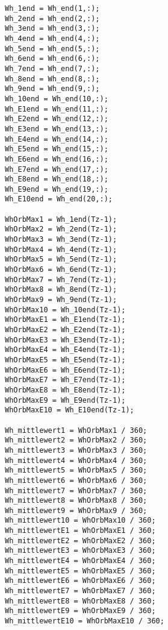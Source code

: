 \begin{appendix}
\begin{lstlisting}
Wh_1end = Wh_end(1,:);
Wh_2end = Wh_end(2,:);
Wh_3end = Wh_end(3,:);
Wh_4end = Wh_end(4,:);
Wh_5end = Wh_end(5,:);
Wh_6end = Wh_end(6,:);
Wh_7end = Wh_end(7,:);
Wh_8end = Wh_end(8,:);
Wh_9end = Wh_end(9,:);
Wh_10end = Wh_end(10,:);
Wh_E1end = Wh_end(11,:);
Wh_E2end = Wh_end(12,:);
Wh_E3end = Wh_end(13,:);
Wh_E4end = Wh_end(14,:);
Wh_E5end = Wh_end(15,:);
Wh_E6end = Wh_end(16,:);
Wh_E7end = Wh_end(17,:);
Wh_E8end = Wh_end(18,:);
Wh_E9end = Wh_end(19,:);
Wh_E10end = Wh_end(20,:);

WhOrbMax1 = Wh_1end(Tz-1);
WhOrbMax2 = Wh_2end(Tz-1);
WhOrbMax3 = Wh_3end(Tz-1);
WhOrbMax4 = Wh_4end(Tz-1);
WhOrbMax5 = Wh_5end(Tz-1);
WhOrbMax6 = Wh_6end(Tz-1);
WhOrbMax7 = Wh_7end(Tz-1);
WhOrbMax8 = Wh_8end(Tz-1);
WhOrbMax9 = Wh_9end(Tz-1);
WhOrbMax10 = Wh_10end(Tz-1);
WhOrbMaxE1 = Wh_E1end(Tz-1);
WhOrbMaxE2 = Wh_E2end(Tz-1);
WhOrbMaxE3 = Wh_E3end(Tz-1);
WhOrbMaxE4 = Wh_E4end(Tz-1);
WhOrbMaxE5 = Wh_E5end(Tz-1);
WhOrbMaxE6 = Wh_E6end(Tz-1);
WhOrbMaxE7 = Wh_E7end(Tz-1);
WhOrbMaxE8 = Wh_E8end(Tz-1);
WhOrbMaxE9 = Wh_E9end(Tz-1);
WhOrbMaxE10 = Wh_E10end(Tz-1);

Wh_mittlewert1 = WhOrbMax1 / 360;
Wh_mittlewert2 = WhOrbMax2 / 360;
Wh_mittlewert3 = WhOrbMax3 / 360;
Wh_mittlewert4 = WhOrbMax4 / 360;
Wh_mittlewert5 = WhOrbMax5 / 360;
Wh_mittlewert6 = WhOrbMax6 / 360;
Wh_mittlewert7 = WhOrbMax7 / 360;
Wh_mittlewert8 = WhOrbMax8 / 360;
Wh_mittlewert9 = WhOrbMax9 / 360;
Wh_mittlewert10 = WhOrbMax10 / 360;
Wh_mittlewertE1 = WhOrbMaxE1 / 360;
Wh_mittlewertE2 = WhOrbMaxE2 / 360;
Wh_mittlewertE3 = WhOrbMaxE3 / 360;
Wh_mittlewertE4 = WhOrbMaxE4 / 360;
Wh_mittlewertE5 = WhOrbMaxE5 / 360;
Wh_mittlewertE6 = WhOrbMaxE6 / 360;
Wh_mittlewertE7 = WhOrbMaxE7 / 360;
Wh_mittlewertE8 = WhOrbMaxE8 / 360;
Wh_mittlewertE9 = WhOrbMaxE9 / 360;
Wh_mittlewertE10 = WhOrbMaxE10 / 360;


\end{lstlisting}
\end{appendix}
